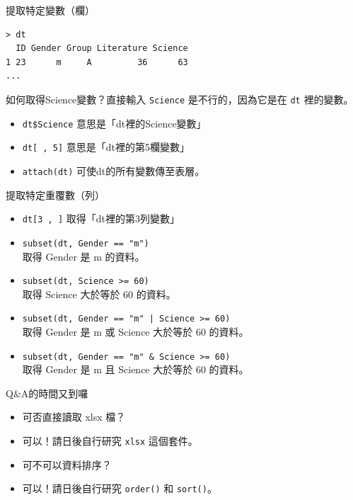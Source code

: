 \documentclass[12pt]{beamer}
\begin{document}
\begin{frame}[fragile]{提取特定變數（欄）}
\begin{verbatim}
> dt
  ID Gender Group Literature Science
1 23      m     A         36      63
...
\end{verbatim}

如何取得Science變數？直接輸入 \verb+Science+ 是不行的，因為它是在 \verb+dt+ 裡的變數。
\begin{itemize}
\item \verb+dt$Science+ 意思是「dt裡的Science變數」
\item \verb+dt[ , 5]+ 意思是「dt裡的第5欄變數」
\item \verb+attach(dt)+ 可使dt的所有變數傳至表層。
\end{itemize}
\end{frame}


\begin{frame}[fragile]{提取特定重覆數（列）}
\begin{itemize}
\item \verb+dt[3 , ]+ 取得「dt裡的第3列變數」
\item \verb+subset(dt, Gender == "m")+ \\ 取得 Gender 是 m 的資料。
\item \verb+subset(dt, Science >= 60)+ \\ 取得 Science 大於等於 60 的資料。
\item \verb+subset(dt, Gender == "m" | Science >= 60)+ \\ 取得 Gender 是 m \alert{或} Science 大於等於 60 的資料。
\item \verb+subset(dt, Gender == "m" & Science >= 60)+ \\ 取得 Gender 是 m \alert{且} Science 大於等於 60 的資料。
\end{itemize}
\end{frame}

\begin{frame}[fragile]{Q\&A的時間又到囉}
\begin{itemize}
\item[Q] 可否直接讀取 xlsx 檔？\\
\item[A] 可以！請日後自行研究 \verb+xlsx+ 這個套件。
\end{itemize}
\begin{itemize}
\item[Q] 可不可以資料排序？\\
\item[A] 可以！請日後自行研究 \verb+order()+ 和 \verb+sort()+。
\end{itemize}
\end{frame}
\end{document}
